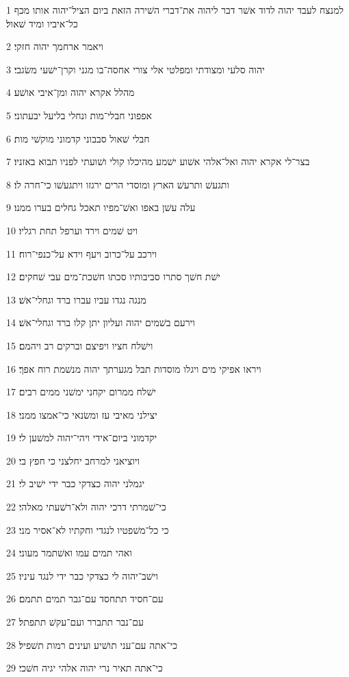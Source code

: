 \par 1 למנצח לעבד יהוה לדוד אשׁר דבר ליהוה את־דברי השׁירה הזאת ביום הציל־יהוה אותו מכף כל־איביו ומיד שׁאול׃
\par 2 ויאמר ארחמך יהוה חזקי׃
\par 3 יהוה סלעי ומצודתי ומפלטי אלי צורי אחסה־בו מגני וקרן־ישׁעי משׂגבי׃
\par 4 מהלל אקרא יהוה ומן־איבי אושׁע׃
\par 5 אפפוני חבלי־מות ונחלי בליעל יבעתוני׃
\par 6 חבלי שׁאול סבבוני קדמוני מוקשׁי מות׃
\par 7 בצר־לי אקרא יהוה ואל־אלהי אשׁוע ישׁמע מהיכלו קולי ושׁועתי לפניו תבוא באזניו׃
\par 8 ותגעשׁ ותרעשׁ הארץ ומוסדי הרים ירגזו ויתגעשׁו כי־חרה לו׃
\par 9 עלה עשׁן באפו ואשׁ־מפיו תאכל גחלים בערו ממנו׃
\par 10 ויט שׁמים וירד וערפל תחת רגליו׃
\par 11 וירכב על־כרוב ויעף וידא על־כנפי־רוח׃
\par 12 ישׁת חשׁך סתרו סביבותיו סכתו חשׁכת־מים עבי שׁחקים׃
\par 13 מנגה נגדו עביו עברו ברד וגחלי־אשׁ׃
\par 14 וירעם בשׁמים יהוה ועליון יתן קלו ברד וגחלי־אשׁ׃
\par 15 וישׁלח חציו ויפיצם וברקים רב ויהמם׃
\par 16 ויראו אפיקי מים ויגלו מוסדות תבל מגערתך יהוה מנשׁמת רוח אפך׃
\par 17 ישׁלח ממרום יקחני ימשׁני ממים רבים׃
\par 18 יצילני מאיבי עז ומשׂנאי כי־אמצו ממני׃
\par 19 יקדמוני ביום־אידי ויהי־יהוה למשׁען לי׃
\par 20 ויוציאני למרחב יחלצני כי חפץ בי׃
\par 21 יגמלני יהוה כצדקי כבר ידי ישׁיב לי׃
\par 22 כי־שׁמרתי דרכי יהוה ולא־רשׁעתי מאלהי׃
\par 23 כי כל־משׁפטיו לנגדי וחקתיו לא־אסיר מני׃
\par 24 ואהי תמים עמו ואשׁתמר מעוני׃
\par 25 וישׁב־יהוה לי כצדקי כבר ידי לנגד עיניו׃
\par 26 עם־חסיד תתחסד עם־גבר תמים תתמם׃
\par 27 עם־נבר תתברר ועם־עקשׁ תתפתל׃
\par 28 כי־אתה עם־עני תושׁיע ועינים רמות תשׁפיל׃
\par 29 כי־אתה תאיר נרי יהוה אלהי יגיה חשׁכי׃
